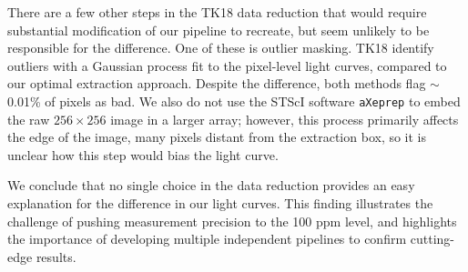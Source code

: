 \documentclass[twocolumn]{aastex62}
\begin{document}
There are a few other steps in the TK18 data reduction that would require substantial modification of our pipeline to recreate, but seem unlikely to be responsible for the difference. One of these is outlier masking. TK18 identify outliers with a Gaussian process fit to the pixel-level light curves, compared to our optimal extraction approach. Despite the difference, both methods flag $\sim$0.01\% of pixels as bad.  We also do not use the STScI software \texttt{aXeprep} to embed the raw $256\times256$ image in a larger array; however, this process primarily affects the edge of the image, many pixels distant from the extraction box, so it is unclear how this step would bias the light curve.
 
We conclude that no single choice in the data reduction provides an easy explanation for the difference in our light curves. This finding illustrates the challenge of pushing measurement precision to the 100 ppm level, and highlights the importance of developing multiple independent pipelines to confirm cutting-edge results.
 
 
\end{document}
